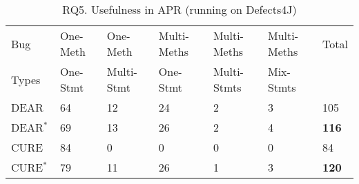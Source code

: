 \begin{table}[t]
	\caption{RQ5. Usefulness in APR (running on Defects4J)}
	\vspace{-12pt}
	\begin{center}
        \tabcolsep 2pt
		\footnotesize
		\renewcommand{\arraystretch}{1} 
		\begin{tabular}{p{1cm}<{\centering}|p{1.1cm}<{\centering}|p{1.1cm}<{\centering}|p{1.3cm}<{\centering}|p{1.3cm}<{\centering}|p{1.3cm}<{\centering}|p{0.5cm}<{\centering}}
			\hline
			Bug            & One-Meth & One-Meth   & Multi-Meths & Multi-Meths & Multi-Meths & Total\\
			Types          & One-Stmt & Multi-Stmt & One-Stmt    & Multi-Stmts & Mix-Stmts   & \\\hline
			DEAR~\cite{icse22}           & 64       & 12         & 24          & 2           & 3           & 105\\
			DEAR$^{*}$     & 69       & 13         & 26          & 2           & 4           & {\bf 116}\\
                        \hline
			CURE~\cite{cure-icse21}           & 84       & 0          & 0           & 0           & 0           & 84\\
			CURE$^{*}$    & 79       & 11         & 26          & 1           & 3           & {\bf 120}\\   
			\hline
		\end{tabular}
		\label{RQ5_1}
	\end{center}
\vspace{-5pt}
\end{table}

